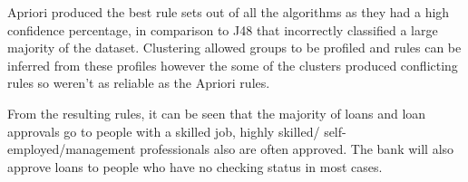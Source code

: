 \documentclass[12pt]{article}
\begin{document}
Apriori produced the best rule sets out of all the algorithms as they had a high confidence percentage, in comparison to J48 that incorrectly classified a large majority of the dataset. Clustering allowed groups to be profiled and rules can be inferred from these profiles however the some of the clusters produced conflicting rules so weren't as reliable as the Apriori rules. 

From the resulting rules, it can be seen that the majority of loans and loan approvals go to people with a skilled job, highly skilled/ self-employed/management professionals also are often approved. The bank will also approve loans to people who have no checking status in most cases. 
\end{document}
